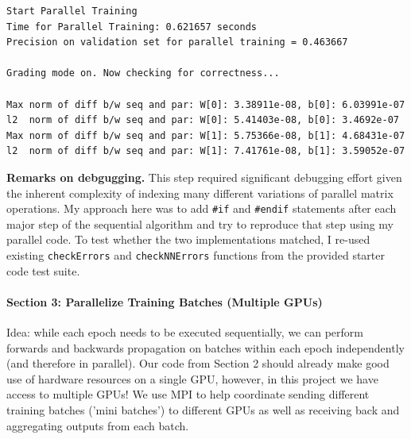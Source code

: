 \documentclass[12pt,letterpaper,twoside]{article}
\begin{document}
\begin{verbatim}
Start Parallel Training
Time for Parallel Training: 0.621657 seconds
Precision on validation set for parallel training = 0.463667

Grading mode on. Now checking for correctness...

Max norm of diff b/w seq and par: W[0]: 3.38911e-08, b[0]: 6.03991e-07
l2  norm of diff b/w seq and par: W[0]: 5.41403e-08, b[0]: 3.4692e-07
Max norm of diff b/w seq and par: W[1]: 5.75366e-08, b[1]: 4.68431e-07
l2  norm of diff b/w seq and par: W[1]: 7.41761e-08, b[1]: 3.59052e-07
\end{verbatim}

\textbf{Remarks on debgugging.} This step required significant debugging effort given
the inherent complexity of indexing many different variations of parallel matrix
operations. My approach here was to add \texttt{\#if} and \texttt{\#endif} statements
after each major step of the sequential algorithm and try to reproduce that step using
my parallel code. To test whether the two implementations matched, I re-used existing
\texttt{checkErrors} and \texttt{checkNNErrors} functions from the provided starter
code test suite.


\pagebreak
\paragraph{Section 3: Parallelize Training Batches (Multiple GPUs)} Idea: while each epoch
needs to be executed sequentially, we can perform forwards and backwards propagation on
batches within each epoch independently (and therefore in parallel). Our code from Section
2 should already make good use of hardware resources on a single GPU, however, in this
project we have access to multiple GPUs! We use MPI to help coordinate sending different
training batches ('mini batches') to different GPUs as well as receiving back and
aggregating outputs from each batch.
\end{document}
